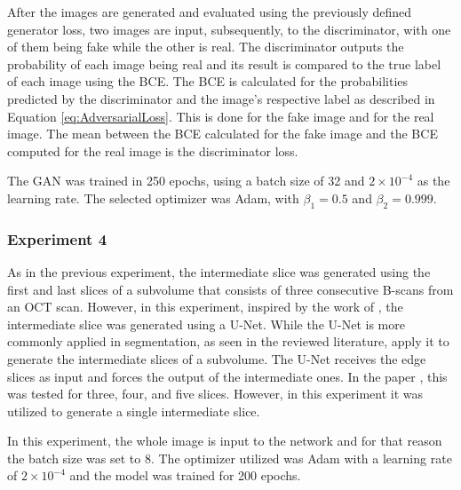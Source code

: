 After the images are generated and evaluated using the previously defined generator loss, two images are input, subsequently, to the discriminator, with one of them being fake while the other is real. The discriminator outputs the probability of each image being real and its result is compared to the true label of each image using the BCE. The BCE is calculated for the probabilities predicted by the discriminator and the image's respective label as described in Equation \ref{eq:AdversarialLoss}. This is done for the fake image and for the real image. The mean between the BCE calculated for the fake image and the BCE computed for the real image is the discriminator loss.
\par
The GAN was trained in 250 epochs, using a batch size of 32 and $2 \times 10^{-4}$ as the learning rate. The selected optimizer was Adam, with $\beta_{1}=0.5$ and $\beta_{2}=0.999$.

\subsubsection{Experiment 4}
As in the previous experiment, the intermediate slice was generated using the first and last slices of a subvolume that consists of three consecutive B-scans from an OCT scan. However, in this experiment, inspired by the work of \textcite{Nishimoto2024}, the intermediate slice was generated using a U-Net. While the U-Net is more commonly applied in segmentation, as seen in the reviewed literature, \textcite{Nishimoto2024} apply it to generate the intermediate slices of a subvolume. The U-Net receives the edge slices as input and forces the output of the intermediate ones. In the paper \parencite{Nishimoto2024}, this was tested for three, four, and five slices. However, in this experiment it was utilized to generate a single intermediate slice.
\par
In this experiment, the whole image is input to the network and for that reason the batch size was set to 8. The optimizer utilized was Adam with a learning rate of $2 \times 10^{-4}$ and the model was trained for 200 epochs.

